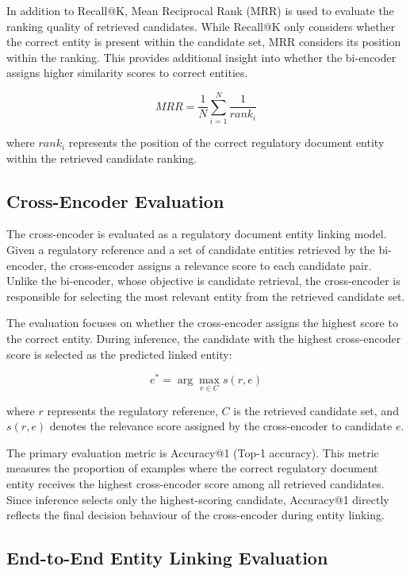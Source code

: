 In addition to Recall@K, Mean Reciprocal Rank (MRR) is used to evaluate the ranking quality of retrieved candidates. While Recall@K only considers whether the correct entity is present within the candidate set, MRR considers its position within the ranking. This provides additional insight into whether the bi-encoder assigns higher similarity scores to correct entities.

\[
MRR = \frac{1}{N}\sum_{i=1}^{N}\frac{1}{rank_i}
\]

where $rank_i$ represents the position of the correct regulatory document entity within the retrieved candidate ranking.

\subsection{Cross-Encoder Evaluation}

The cross-encoder is evaluated as a regulatory document entity linking model. Given a regulatory reference and a set of candidate entities retrieved by the bi-encoder, the cross-encoder assigns a relevance score to each candidate pair. Unlike the bi-encoder, whose objective is candidate retrieval, the cross-encoder is responsible for selecting the most relevant entity from the retrieved candidate set.

The evaluation focuses on whether the cross-encoder assigns the highest score to the correct entity. During inference, the candidate with the highest cross-encoder score is selected as the predicted linked entity:

\begin{equation}
e^* = \arg\max_{e \in C} s(r,e)
\end{equation}

where $r$ represents the regulatory reference, $C$ is the retrieved candidate set, and $s(r,e)$ denotes the relevance score assigned by the cross-encoder to candidate $e$.

The primary evaluation metric is Accuracy@1 (Top-1 accuracy). This metric measures the proportion of examples where the correct regulatory document entity receives the highest cross-encoder score among all retrieved candidates. Since inference selects only the highest-scoring candidate, Accuracy@1 directly reflects the final decision behaviour of the cross-encoder during entity linking.

\subsection{End-to-End Entity Linking Evaluation}

